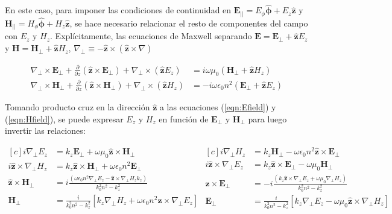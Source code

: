 En este caso, para imponer las condiciones de continuidad en $\textbf{E}_{||} = E_\phi \boldsymbol{\hat{\phi}} + E_z \hat{\textbf{z}}$ y $\textbf{H}_{||}= H_\phi \hat{\boldsymbol{\phi}} + H_z \hat{\textbf{z}}$, se hace necesario relacionar el resto de componentes del campo con $E_z$ y $H_z$. Explícitamente, las ecuaciones de Maxwell separando $\textbf{E}=\textbf{E}_\perp +\hat{\textbf{z}} E_z$ y $\textbf{H}=\textbf{H}_\perp +\hat{\textbf{z}} H_z$, $\nabla_\perp \equiv - \hat{\textbf{z}}\times (\hat{\textbf{z}}\times\nabla)   $

\begin{align}
	\nabla_\perp \times  \textbf{E}_\perp + \frac{\partial}{\partial z} (\hat{\textbf{z}} \times \textbf{E}_\perp) + \nabla_\perp \times (\hat{\textbf{z}} E_z) &= i\omega\mu_0(\textbf{H}_\perp +\hat{\textbf{z}} H_z)
	\label{eqn:Efield}
	\\
	\nabla_\perp \times  \textbf{H}_\perp + \frac{\partial}{\partial z} (\hat{\textbf{z}} \times \textbf{H}_\perp) + \nabla_\perp \times (\hat{\textbf{z}} H_z) &= -i\omega \epsilon_0 n^2 (\textbf{E}_\perp +\hat{\textbf{z}} E_z)
	\label{eqn:Hfield}
\end{align}

Tomando producto cruz en la dirección $\hat{\textbf{z}}$ a las ecuaciones (\ref{eqn:Efield}) y (\ref{eqn:Hfield}), se puede expresar $E_z$ y $H_z$ en función de $\textbf{E}_\perp$ y $\textbf{H}_\perp$ para luego invertir las relaciones: 

\begin{equation*}
\begin{aligned}[c]
	 i\nabla_\perp E_z &= k_z\textbf{E}_\perp +\omega \mu_0 \hat{\textbf{z}} \times \textbf{H}_\perp  
	 	  	 \\
	 	  	i\hat{\textbf{z}} \times \nabla_\perp H_z &= k_z \hat{\textbf{z}} \times\textbf{H}_\perp + \omega\epsilon_0 n^2 \textbf{E}_\perp
	 \\
	  \hat{\textbf{z}} \times \textbf{H}_\perp &= i\frac{(\omega\epsilon_0 n^2 \nabla_\perp E_z  - \hat{\textbf{z}} \times \nabla_\perp H_z k_z)}{k_0^2 n^2 - k_z^2}
	  \\
	  	 \textbf{H}_\perp &= \frac{i}{k_0^2 n^2 - k_z^2}[k_z\nabla_\perp H_z + \omega \epsilon_0 n^2\hat{\textbf{z}} \times \nabla_\perp E_z]
\end{aligned}
\begin{aligned}[c]
	i \nabla_\perp H_z &= k_z \textbf{H}_\perp - \omega \epsilon_0 n^2  \hat{\textbf{z}} \times \textbf{E}_\perp 
	\\
	i\hat{\textbf{z}} \times\nabla_\perp E_z &= k_z  \hat{\textbf{z}} \times \textbf{E}_\perp - \omega \mu_0 \textbf{H}_\perp
	\\
	\hat{\textbf{z}} \times \textbf{E}_\perp &= -i\frac{(k_z\hat{\textbf{z}} \times \nabla_\perp E_z + \omega\mu_0 \nabla_\perp H_z)  }{k_0^2 n^2 - k_z^2}
	\\
	\textbf{E}_\perp &= \frac{i}{k_0^2 n^2 - k_z^2}[k_z \nabla_\perp E_z - \omega\mu_0 \hat{\textbf{z}} \times \nabla_\perp H_z]
\end{aligned}
\end{equation*}



